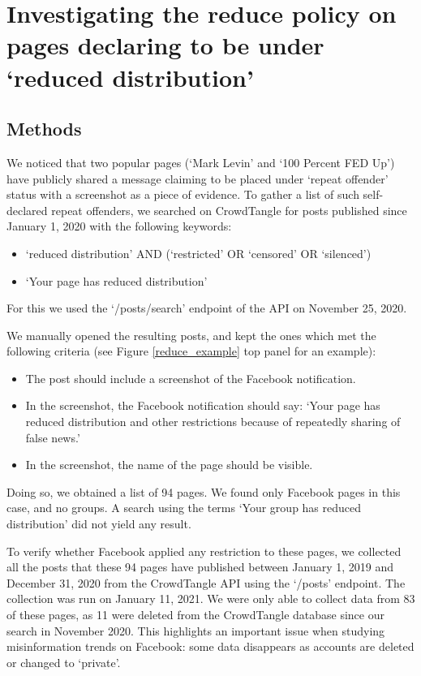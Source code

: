 \documentclass[review]{elsarticle}
\begin{document}
{\section{Investigating the reduce policy on pages declaring to be under `reduced distribution'} 

\subsection{Methods}

We noticed that two popular pages (`Mark Levin' and `100 Percent FED Up') have publicly shared a message claiming to be placed under `repeat offender' status with a screenshot as a piece of evidence.
To gather a list of such self-declared repeat offenders, we searched on CrowdTangle for posts published since January 1, 2020 with the following keywords:
\begin{itemize}
\item `reduced distribution' AND (`restricted' OR `censored' OR `silenced')
\item `Your page has reduced distribution'
\end{itemize}
For this we used the `/posts/search' endpoint of the API on November 25, 2020. 

We manually opened the resulting posts, and kept the ones which met the following criteria (see Figure \ref{reduce_example} top panel for an example):
\begin{itemize}
\item The post should include a screenshot of the Facebook notification.
\item In the screenshot, the Facebook notification should say: `Your page has reduced distribution and other restrictions because of repeatedly sharing of false news.'
\item In the screenshot, the name of the page should be visible.
\end{itemize}

Doing so, we obtained a list of 94 pages. 
We found only Facebook pages in this case, and no groups. 
A search using the terms `Your group has reduced distribution' did not yield any result.

To verify whether Facebook applied any restriction to these pages, we collected all the posts that these 94 pages have published between January 1, 2019 and December 31, 2020 from the CrowdTangle API using the `/posts' endpoint. 
The collection was run on January 11, 2021.
We were only able to collect data from 83 of these pages, as 11 were deleted from the CrowdTangle database since our search in November 2020. 
This highlights an important issue when studying misinformation trends on Facebook: some data disappears as accounts are deleted or changed to ‘private’.

}
\end{document}
